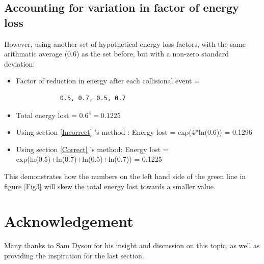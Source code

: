 \documentclass[a4paper, 12pt]{article}
\begin{document}
	\subsection{Accounting for variation in factor of energy loss}
	However, using another set of hypothetical energy loss factors, with the same arithmatic average (0.6) as the set before, but with a non-zero standard deviation:
	\begin{itemize}
		\item Factor of reduction in energy after each collisional event = \begin{verbatim}
			0.5, 0.7, 0.5, 0.7
		\end{verbatim}
		\item Total energy lost = $0.6^4 =  0.1225$
		\item Using section \ref{Incorrect} 's method : Energy lost = exp(4*ln(0.6)) = 0.1296
		\item Using section \ref{Correct} 's method: Energy lost = exp(ln(0.5)+ln(0.7)+ln(0.5)+ln(0.7)) = 0.1225
	\end{itemize}
	This demonstrates how the numbers on the left hand side of the green line in figure \ref{Fig3} will skew the total energy lost towards a smaller value.
\section{Acknowledgement}
	Many thanks to Sam Dyson for his insight and discussion on this topic, as well as providing the inspiration for the last section.
\end{document}
